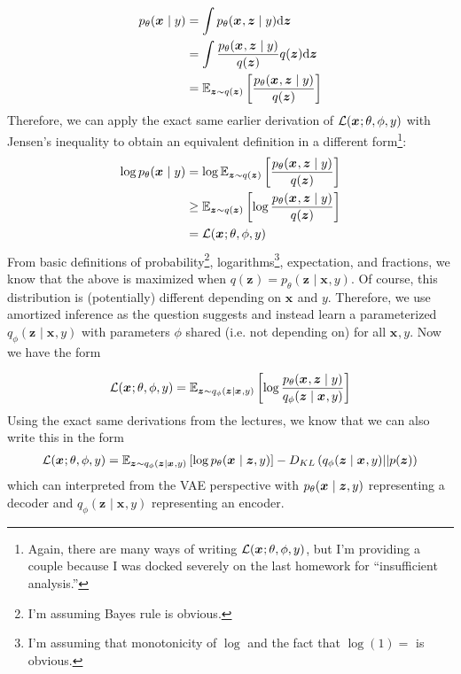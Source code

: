 \documentclass[11pt]{article}
\renewcommand\vec[2][]{\bm{#2}_{#1}}
\begin{document}
\begin{align}
	p_{\theta}(\vec x \mid y)
		&= \int \pt (\vec x, \vec z \mid y) \dz \\
		&= \int  \frac{ \pt (\vec x, \vec z \mid y) }{  q(\vec z)  } q(\vec z) \dz \\
		&= \E[\vec z \sim q(\vec z)]{   \frac{ \pt (\vec x, \vec z \mid y) }{  q(\vec z)  }    }
\end{align}
Therefore, we can apply the exact same earlier derivation of $\elbo$ with Jensen's inequality to obtain an equivalent definition in a different form\footnote{Again, there are many ways of writing $\elbo$, but I'm providing a couple because I was docked severely on the last homework for ``insufficient analysis.''}:
\begin{align}
\log p_{\theta}(\vec x \mid y)
	&= \log\E[\vec z \sim q(\vec z)]{   \frac{ \pt (\vec x, \vec z \mid y) }{  q(\vec z)  }    }\\
	&\ge \E[\vec z \sim q(\vec z)]{\log     \frac{ \pt (\vec x, \vec z \mid y) }{  q(\vec z)  }       } \\
	&= \elbo 
\end{align}
From basic definitions of probability\footnote{I'm assuming Bayes rule is obvious.}, logarithms\footnote{I'm assuming that monotonicity of $\log$ and the fact that $\log(1) = $ is obvious.}, expectation, and fractions, we know that the above is maximized when $q(\vec z) = p_{\theta}(\vec z \mid \vec x, y)$. Of course, this distribution is (potentially) different depending on $\vec x$ and $y$. Therefore, we use amortized inference as the question suggests and instead learn a parameterized $q_{\phi}(\vec z \mid \vec x, y)$ with parameters $\phi$ shared (i.e. not depending on) for all $\vec x, y$. Now we have the form 

\newcommand\qp{q_{\phi}(\vec z \mid \vec x, y)}
\begin{align}
 \elbo 
 	&=  \E[\vec z \sim \qp ]{\log     \frac{ \pt (\vec x, \vec z \mid y) }{ \qp  }       } \\
\end{align}
Using the exact same derivations from the lectures, we know that we can also write this in the form 
\begin{align}
	\elbo 
	    &=  \E[\vec z \sim \qp ]{\log \pt (\vec x \mid \vec z, y)  } 
	    	- \dkl{\qp}{p(\vec z)} \\
\end{align}
which can interpreted from the VAE perspective with $ \pt (\vec x \mid \vec z, y) $ representing a decoder and $\qp$ representing an encoder.
\end{document}
